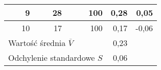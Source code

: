 \begin{table}[H]
{\begin{tabular}{|r|r|r|r|r}
9                         & 28                                        & 100                               & 0,28                               & \multicolumn{1}{r|}{0,05}                                \\ \hline
10                        & 17                                        & 100                               & 0,17                               & \multicolumn{1}{r|}{-0,06}                               \\ \hline
\multicolumn{3}{|l|}{Wartość średnia $\overline{V}$}                                     & 0,23                               & \multicolumn{1}{l}{}                                     \\ \cline{1-4}
\multicolumn{3}{|l|}{Odchylenie standardowe $S$}                                                          & 0,06                               & \multicolumn{1}{l}{}                                     \\ \cline{1-4}
\end{tabular}%
}
\end{table}